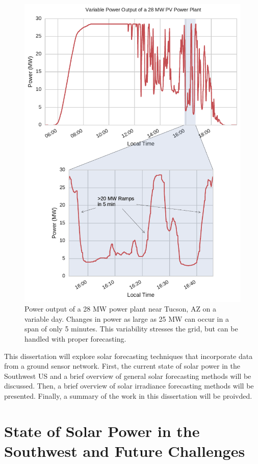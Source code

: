 \begin{figure}[h]
\centering
\includegraphics[width=.9\textwidth]{figs/avalon_ramps.pdf}
\caption[Variable power output of a 28 MW solar power plant]{
Power output of a 28 MW power plant near Tucson, AZ on a variable
day. Changes in power as large as 25 MW can occur in a span of only 5
minutes. This variability stresses the grid, but can be handled with
proper forecasting.}
\label{fig:variability_example}
\end{figure}

This dissertation will explore solar forecasting techniques
that incorporate data from a ground sensor network.
First, the current state of solar power in the Southwest US and a
brief overview of general solar forecasting methods will be
discussed. Then, a brief overview of solar irradiance forecasting
methods will be presented. Finally, a summary of the work in this
dissertation will be proivded.

\section{State of Solar Power in the Southwest and Future Challenges}

